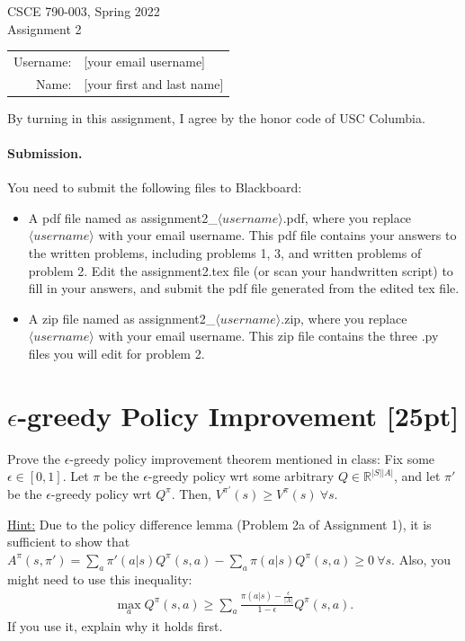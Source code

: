 \documentclass[11pt]{article}
\theoremstyle{case}
\begin{document}
\begin{center}
{\Large CSCE 790-003, Spring 2022 \\ Assignment 2}

\begin{tabular}{rl}
Username: & [your email username] \\
Name: & [your first and last name] \\
\end{tabular}
\end{center}
By turning in this assignment, I agree by the honor code of USC Columbia.

\paragraph{Submission.}
You need to submit the following files to Blackboard:
\begin{itemize}
    \item A pdf file named as assignment2\_$\langle username \rangle$.pdf, where you replace $\langle username \rangle$ with your email username. This pdf file contains your answers to the written problems, including problems 1, 3, and written problems of problem 2. Edit the assignment2.tex file (or scan your handwritten script) to fill in your answers, and submit the pdf file generated from the edited tex file.
    \item A zip file named as assignment2\_$\langle username \rangle$.zip, where you replace $\langle username \rangle$ with your email username. This zip file contains the three .py files you will edit for problem 2.
\end{itemize}

\section{$\epsilon$-greedy Policy Improvement [25pt]}
Prove the $\epsilon$-greedy policy improvement theorem mentioned in class:
Fix some $\epsilon\in[0,1]$.
Let $\pi$ be the $\epsilon$-greedy policy wrt some arbitrary $Q\in\mathbb{R}^{|S||A|}$, and let $\pi'$ be the $\epsilon$-greedy policy wrt $Q^\pi$.
Then, $V^{\pi'}(s) \geq V^{\pi}(s) ~\forall s$.

\underline{Hint:}
Due to the policy difference lemma (Problem 2a of Assignment 1), it is sufficient to show that $A^\pi(s,\pi') = \sum_{a} \pi'(a|s)Q^\pi(s,a) - \sum_{a} \pi(a|s)Q^\pi(s,a) \geq 0 ~\forall s$.
Also, you might need to use this inequality:
\begin{align*}
   \max_a Q^\pi(s,a) \geq \sum_a \frac{\pi(a|s)-\frac{\epsilon}{|A|}}{1-\epsilon} Q^\pi(s,a).
\end{align*}
If you use it, explain why it holds first.
\end{document}
